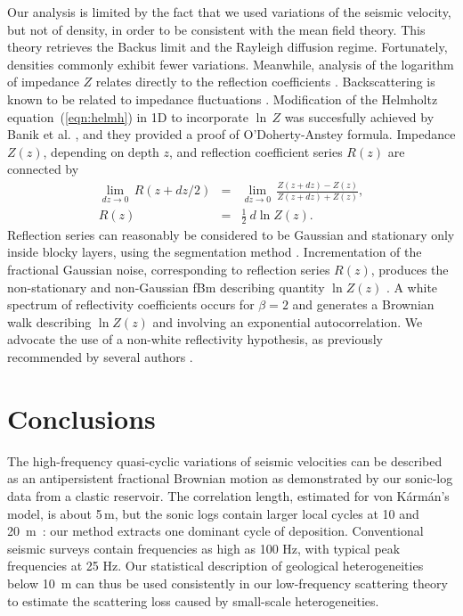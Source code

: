 Our analysis is limited by the fact that we used variations of the seismic velocity, 
but not of density, in order to be consistent with the mean field theory. 
This theory retrieves the Backus limit and the Rayleigh diffusion regime.
Fortunately, densities commonly exhibit fewer variations.
Meanwhile, analysis of the logarithm of impedance $Z$
relates directly to the reflection coefficients \cite[]{Shtatland_91}.
Backscattering is known to be related to
impedance fluctuations \cite[]{Banik_LS85,Wu_88}.
Modification of the Helmholtz equation~(\ref{eqn:helmh}) in 1D to incorporate $\ln\,Z$
was succesfully achieved by Banik et al. , and they provided a proof of O'Doherty-Anstey formula.
Impedance $Z(z)$, depending on depth $z$, and reflection coefficient series $R(z)$ are connected by
\begin{eqnarray}
\lim_{dz\rightarrow 0}\,R(z+dz/2) & = & \lim_{dz\rightarrow 0}\,\frac{Z(z+dz)-Z(z)}{Z(z+dz)+Z(z)},\\
R(z) & = & \frac{1}{2}~{d\ln Z(z)}.
\end{eqnarray}
Reflection series can reasonably be considered to be Gaussian and stationary
only inside blocky layers, using the segmentation method \cite[]{Todoeschuck_JL90}.
Incrementation of the fractional Gaussian noise, corresponding to
reflection series $R(z)$, produces the non-stationary and non-Gaussian fBm describing quantity $\ln Z(z)$
\cite[]{Shtatland_91}.
A white spectrum of reflectivity coefficients occurs for $\beta=2$ and generates a Brownian walk describing $\ln Z(z)$
and involving an exponential autocorrelation.
We advocate the use of a non-white reflectivity hypothesis, as previously recommended by 
several authors \cite[]{Todoeschuck_JL90,Lancaster_W00,Anstey_D02b}.

\section{Conclusions}

The high-frequency quasi-cyclic variations of seismic velocities
can be described as an antipersistent fractional Brownian motion
as demonstrated by our sonic-log data from a clastic reservoir.
The correlation length, estimated for von K\'arm\'an's model,
is about 5\,m, but the sonic logs contain
larger local cycles at 10 and 20~m~: our method extracts  
one dominant cycle of deposition.
Conventional seismic surveys contain frequencies as high as 100 Hz,
with typical peak frequencies at 25 Hz.
Our statistical description of geological heterogeneities below 10~m
can thus be used consistently in our low-frequency scattering theory
to estimate the scattering loss caused by small-scale heterogeneities.

